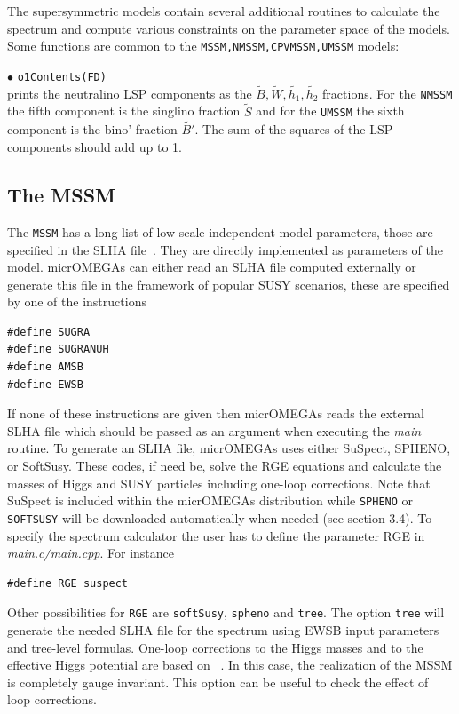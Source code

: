 \documentclass[12pt,a4paper]{article}
\begin{document}
The supersymmetric models contain several additional routines to calculate the spectrum
and compute various constraints on the parameter space of the models. Some functions are
common to the \verb|MSSM,NMSSM,CPVMSSM,UMSSM| models: 


\noindent
$\bullet$  \verb|o1Contents(FD)|\\
prints  the neutralino LSP components as the  $\tilde{B},\tilde{W},
\tilde{h_1},\tilde{h_2}$ fractions. For the {\tt NMSSM} the fifth component is
the singlino fraction  $\tilde{S}$ and for the {\tt UMSSM} the sixth component is
the bino' fraction  $\tilde{B'}$. The sum of the squares of the LSP components
should add up to 1. 



\subsection{The MSSM}
The {\tt MSSM} has a long list of low scale  independent model 
parameters, those are specified in the SLHA file~\cite{Skands:2003cj,Allanach:2008qq}.
They are directly implemented as parameters of the model.
micrOMEGAs can either read an SLHA file computed externally or
generate  this file in the  framework of  popular  SUSY scenarios, these are specified by one of the instructions
\begin{verbatim}
#define SUGRA
#define SUGRANUH
#define AMSB 
#define EWSB
\end{verbatim}  
If none of these instructions are given then micrOMEGAs reads the external SLHA file which should be passed as an argument  when executing the {\it main} routine. 
To generate  an SLHA file,  micrOMEGAs uses either SuSpect, SPHENO, or SoftSusy. These codes, if need be, solve the RGE equations and calculate the masses of Higgs and SUSY particles including one-loop corrections.  Note that SuSpect  is included within the micrOMEGAs distribution while  {\tt SPHENO} or {\tt SOFTSUSY} will be downloaded automatically when needed (see section 3.4).
To specify  the spectrum calculator  the user has to define the parameter RGE  in {\it main.c/main.cpp}. For instance
\begin{verbatim}
#define RGE suspect
\end{verbatim}  
Other possibilities for \verb|RGE| are  \verb|softSusy|, \verb|spheno| and \verb|tree|. The option \verb|tree| will generate the needed SLHA file for the spectrum  using  EWSB input parameters and tree-level formulas. One-loop corrections to the Higgs masses and to the effective Higgs potential are based on ~\cite{Carena:1995wu}. In this case, the realization of the MSSM is  completely gauge invariant. This option can be useful to check the 
effect of loop corrections.    
\end{document}
